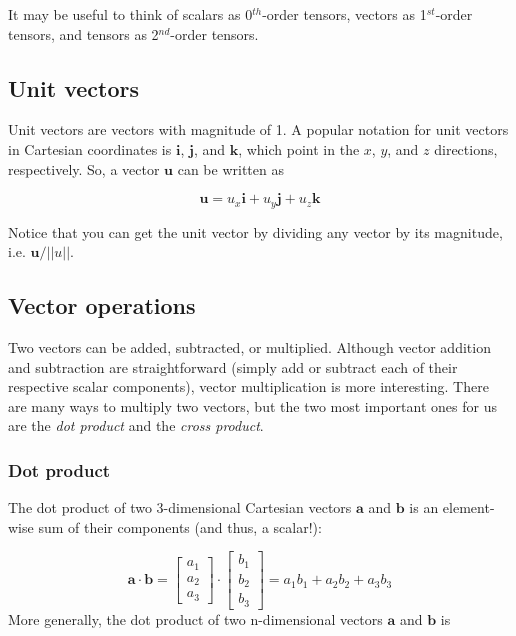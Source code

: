 \documentclass[12pt]{article}
\numberwithin{equation}{section}
\numberwithin{figure}{section}
\numberwithin{table}{section}
\begin{document}
It may be useful to think of scalars as 0$^{th}$-order tensors, vectors as
1$^{st}$-order tensors, and tensors as 2$^{nd}$-order tensors.\\

\subsection{Unit vectors}

Unit vectors are vectors with magnitude of 1.
A popular notation for unit vectors in Cartesian coordinates is $\mathbf{i}$,
$\mathbf{j}$, and $\mathbf{k}$, which point in the $x$, $y$, and $z$ directions,
respectively.
So, a vector $\mathbf{u}$ can be written as

\begin{equation}
  \mathbf{u} = u_x \mathbf{i} + u_y \mathbf{j} + u_z \mathbf{k}
\end{equation}

Notice that you can get the unit vector by dividing any vector by its
magnitude, i.e. $\mathbf{u}/||u||$.

\subsection{Vector operations}

Two vectors can be added, subtracted, or multiplied.
Although vector addition and subtraction are straightforward (simply add or
subtract each of their respective scalar components), vector multiplication is
more interesting.
There are many ways to multiply two vectors, but the two most important ones for
us are the \textit{dot product} and the \textit{cross product}.

\subsubsection{Dot product}

The dot product of two 3-dimensional Cartesian vectors
$\mathbf{a}$ and $\mathbf{b}$ is an element-wise sum of their components
(and thus, a scalar!):

\begin{equation}
  \mathbf{a} \cdot \mathbf{b} =
  \begin{bmatrix}
    a_1 \\
    a_2 \\
    a_3
  \end{bmatrix}
  \cdot
  \begin{bmatrix}
    b_1 \\
    b_2 \\
    b_3
  \end{bmatrix}
  = a_1 b_1 + a_2 b_2 + a_3 b_3
\end{equation}
More generally, the dot product of two n-dimensional vectors $\mathbf{a}$ and
$\mathbf{b}$ is
\end{document}
